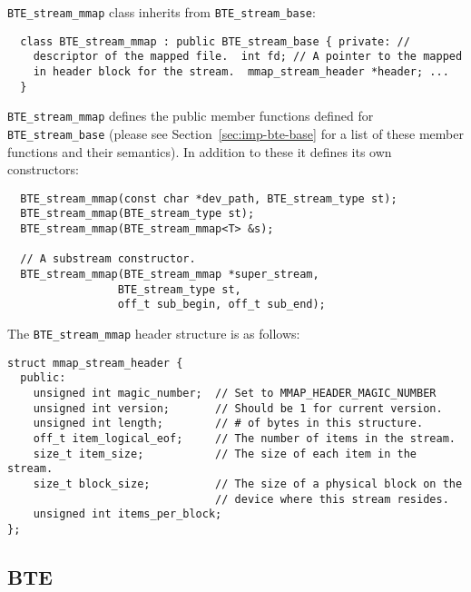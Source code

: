 \lstinline|BTE_stream_mmap| class inherits from \lstinline|BTE_stream_base|:
\begin{lstlisting}
  class BTE_stream_mmap : public BTE_stream_base { private: //
    descriptor of the mapped file.  int fd; // A pointer to the mapped
    in header block for the stream.  mmap_stream_header *header; ...
  }
\end{lstlisting}

\lstinline|BTE_stream_mmap| defines the public member functions
defined for \lstinline|BTE_stream_base| (please see
Section~\ref{sec:imp-bte-base} for a list of these member functions
and their semantics).  In addition to these it defines its own
constructors:   

\begin{lstlisting}
  BTE_stream_mmap(const char *dev_path, BTE_stream_type st);
  BTE_stream_mmap(BTE_stream_type st); 
  BTE_stream_mmap(BTE_stream_mmap<T> &s); 
  
  // A substream constructor.
  BTE_stream_mmap(BTE_stream_mmap *super_stream,
                 BTE_stream_type st,
                 off_t sub_begin, off_t sub_end);
\end{lstlisting}

The \lstinline|BTE_stream_mmap| header structure
is as follows:

\begin{lstlisting}
struct mmap_stream_header { 
  public:
    unsigned int magic_number;  // Set to MMAP_HEADER_MAGIC_NUMBER
    unsigned int version;       // Should be 1 for current version.
    unsigned int length;        // # of bytes in this structure.
    off_t item_logical_eof;     // The number of items in the stream.
    size_t item_size;           // The size of each item in the stream.
    size_t block_size;          // The size of a physical block on the
                                // device where this stream resides.
    unsigned int items_per_block;
};
\end{lstlisting}




\subsection{BTE }

